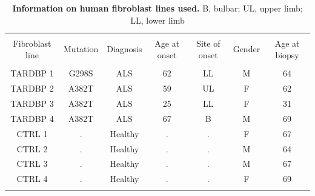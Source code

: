\begin{table}[!htbp] \centering 
	\caption[Information on human fibroblast lines used.]{
		\textbf{Information on human fibroblast lines used.} B,	bulbar;	UL, upper limb;	LL,	lower limb
	} 
	\label{append:fibros} 
	\begin{tabular}{@{\extracolsep{5pt}} ccccccc} 
		\\[-1.8ex]\hline 
		\hline \\[-1.8ex] 
		Fibroblast line & Mutation & Diagnosis & Age at onset & Site of onset & Gender & Age at biopsy \\ 
		\hline \\[-1.8ex] 
		TARDBP 1 & G298S & ALS & 62 & LL & M & 64 \\ 
		TARDBP 2 & A382T & ALS & 59 & UL & F & 62 \\ 
		TARDBP 3 & A382T & ALS & 25 & LL & F & 31 \\ 
		TARDBP 4 & A382T & ALS & 67 & B & M & 69 \\ 
		CTRL 1 & . & Healthy & . & . & F & 67 \\ 
		CTRL 2 & . & Healthy & . & . & M & 64 \\ 
		CTRL 3 & . & Healthy & . & . & M & 67 \\ 
		CTRL 4 & . & Healthy & . & . & F & 69 \\ 
		\hline \\[-1.8ex] 
	\end{tabular} 
\end{table} 


